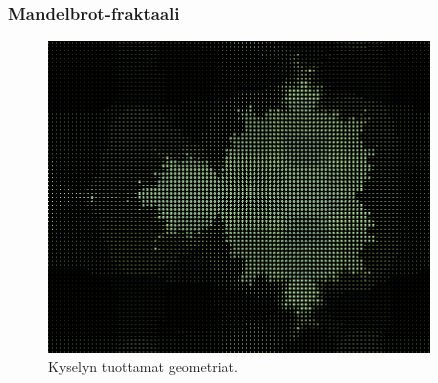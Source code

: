 \documentclass[english,finnish]{beamer}
\begin{document}
\begin{frame}[fragile=singleslide]\frametitle{Mandelbrot-fraktaali}
\begin{figure}[h]
\begin{center}
\includegraphics[width=0.90\textwidth]{mandelbrot.png}
\caption{Kyselyn tuottamat geometriat.}
\label{kuva4}
\end{center}
\end{figure}
\end{frame}
\end{document}
